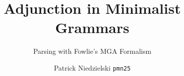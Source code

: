 \documentclass{beamer}
\title[ Parsing MGAs ]{ Adjunction in Minimalist Grammars }
\subtitle{ Parsing with Fowlie's MGA Formalism }
\author[ \texttt{pmn25} ]{ Patrick Niedzielski \texttt{pmn25} }
\begin{document}
\begin{frame}
  \titlepage
\end{frame}
\end{document}
